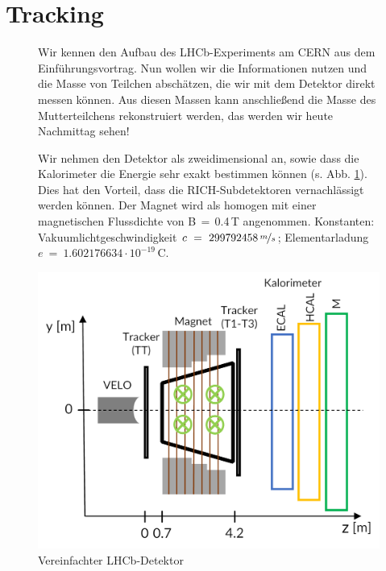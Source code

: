 

\section*{Tracking}
\begin{figure}[h]
     \begin{minipage}[t]{0.6\textwidth}
      \vspace{-6cm} Wir kennen den Aufbau des LHCb-Experiments am CERN aus dem Einführungsvortrag. Nun wollen wir die Informationen nutzen und die Masse von Teilchen abschätzen, die wir mit dem Detektor direkt messen können. Aus diesen Massen kann anschließend die Masse des Mutterteilchens rekonstruiert werden, das werden wir heute Nachmittag sehen! 
      
      Wir nehmen den Detektor als zweidimensional an, sowie dass die Kalorimeter die Energie sehr exakt bestimmen können (s. Abb. \ref{fig: Der Detektor}). Dies hat den Vorteil, dass die RICH-Subdetektoren vernachlässigt werden können. Der Magnet wird als homogen mit einer magnetischen Flussdichte von B$\,=\,$0.4\,T angenommen.  Konstanten: Vakuumlichtgeschwindigkeit $c~=~ 299792458 \, \nicefrac{m}{s}$; Elementarladung $e~=~ 1.602176634\cdot10^{-19}$\,C.  \end{minipage}
            \begin{minipage}[t]{0.4\textwidth}
            \centering
            \includegraphics[width=\textwidth]{Figures Worksheets/LHCb_Calculation_LHCb_Detector_DE.png} 
            \caption{Vereinfachter LHCb-Detektor} \label{fig: Der Detektor}
            \end{minipage}
            \end{figure}
